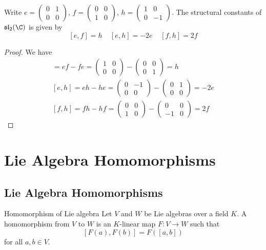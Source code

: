 \documentclass[a4paper]{article}
\begin{document}
\begin{eg}{}{} Write $e=\begin{pmatrix}
0 & 1\\0 & 0
\end{pmatrix}$, $f=\begin{pmatrix}
0 & 0\\1 & 0
\end{pmatrix}$,  $h=\begin{pmatrix}
1 & 0\\0 & -1
\end{pmatrix}$. The structural constants of $\mathfrak{sl}_2(\C)$ is given by $$[e,f]=h\;\;\;\;[e,h]=-2e\;\;\;\;[f,h]=2f$$
\tcbline
\begin{proof}
We have 
\begin{align*}
[e,f]=ef-fe=\begin{pmatrix}
1 & 0\\0 & 0
\end{pmatrix}-\begin{pmatrix}
0 & 0\\0 & 1
\end{pmatrix}=h\\
[e,h]=eh-he=\begin{pmatrix}
0 & -1\\0 & 0
\end{pmatrix}-\begin{pmatrix}
0 & 1\\0 & 0
\end{pmatrix}=-2e\\
[f,h]=fh-hf=\begin{pmatrix}
0 & 0\\1 & 0
\end{pmatrix}-\begin{pmatrix}
0 & 0\\-1 & 0
\end{pmatrix}=2f
\end{align*}
\end{proof}
\end{eg}

\pagebreak
\section{Lie Algebra Homomorphisms}
\subsection{Lie Algebra Homomorphisms}
\begin{defn}{Homomorphism of Lie algebra}{} Let $V$ and $W$ be Lie algebras over a field $K$. A homomorphism from $V$ to $W$ is an $K$-linear map $F:V\to W$ such that $$[F(a),F(b)]=F\left([a,b]\right)$$ for all $a,b\in V$. 
\end{defn}
\end{document}
